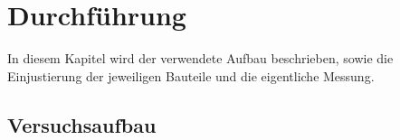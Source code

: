 \section{Durchführung}
\label{sec:durchfuehrung}

In diesem Kapitel wird der verwendete Aufbau beschrieben,
sowie die Einjustierung der jeweiligen Bauteile und die eigentliche Messung.

\subsection{Versuchsaufbau}